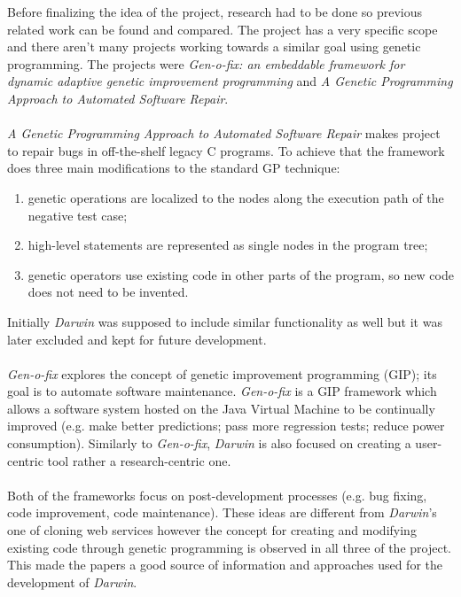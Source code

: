 Before finalizing the idea of the project, research had to be done so previous related work can be found and compared. The project has a very
specific scope and there aren't many projects working towards a similar goal using genetic programming. The projects were
\textit{Gen-o-fix: an embeddable framework for dynamic adaptive genetic improvement programming} and \textit{A Genetic Programming Approach to
Automated Software Repair}\cite{softrepair}.
\paragraph{}
\textit{A Genetic Programming Approach to Automated Software Repair} makes project to repair bugs in off-the-shelf legacy C programs.
To achieve that the framework does three main modifications to the standard GP technique:
\begin{enumerate} 
\item genetic operations are localized to the nodes along the execution path of the negative test case; 
\item high-level statements are represented as single nodes in the program tree;
\item genetic operators use existing code in other parts of the program, so new code does not need to be invented.
\end{enumerate}
 Initially \textit{Darwin} was supposed to include similar functionality as well but it was later excluded and kept for future development.
\paragraph{}
\textit{Gen-o-fix} explores the concept of  genetic improvement programming (GIP); its goal is to automate software
maintenance. \textit{Gen-o-fix} is a GIP framework which allows a software system hosted on the Java Virtual Machine to be continually improved
(e.g. make better predictions; pass more regression tests; reduce power consumption). Similarly to \textit{Gen-o-fix},
\textit{Darwin} is also focused on creating a user-centric tool rather a research-centric one.
\paragraph{}
Both of the frameworks focus on post-development processes (e.g. bug fixing, code improvement, code maintenance). These ideas are different
from \textit{Darwin}'s one of cloning web services however the concept for creating and modifying existing code through genetic programming is observed
in all three of the project. This made the papers a good source of information and approaches used for the development of \textit{Darwin}.

